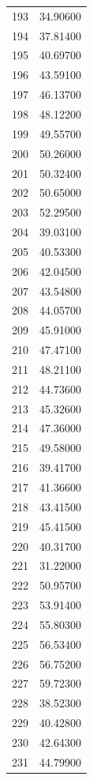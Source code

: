 \documentclass[
  letterpaper,
  DIV=11,
  numbers=noendperiod]{scrreprt}
\begin{document}
\begin{tcolorbox}
\begin{tabular}{lr}
193  &         34.90600 \\
194  &         37.81400 \\
195  &         40.69700 \\
196  &         43.59100 \\
197  &         46.13700 \\
198  &         48.12200 \\
199  &         49.55700 \\
200  &         50.26000 \\
201  &         50.32400 \\
202  &         50.65000 \\
203  &         52.29500 \\
204  &         39.03100 \\
205  &         40.53300 \\
206  &         42.04500 \\
207  &         43.54800 \\
208  &         44.05700 \\
209  &         45.91000 \\
210  &         47.47100 \\
211  &         48.21100 \\
212  &         44.73600 \\
213  &         45.32600 \\
214  &         47.36000 \\
215  &         49.58000 \\
216  &         39.41700 \\
217  &         41.36600 \\
218  &         43.41500 \\
219  &         45.41500 \\
220  &         40.31700 \\
221  &         31.22000 \\
222  &         50.95700 \\
223  &         53.91400 \\
224  &         55.80300 \\
225  &         56.53400 \\
226  &         56.75200 \\
227  &         59.72300 \\
228  &         38.52300 \\
229  &         40.42800 \\
230  &         42.64300 \\
231  &         44.79900 \\

\end{tabular}
\end{tcolorbox}
\end{document}
